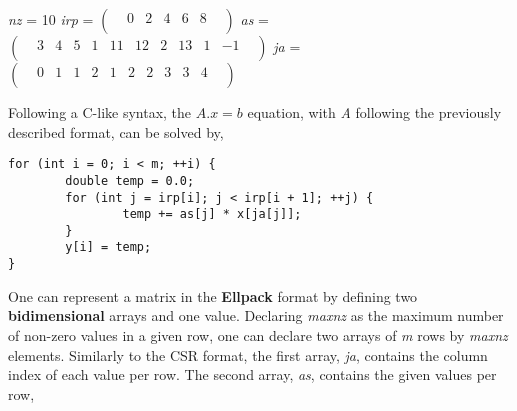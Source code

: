 \documentclass[12pt]{article}
\begin{document}
\begin{center}
\textit{nz}  =  10 
\linebreak
\linebreak
\textit{irp}  =   
$
\begin{pmatrix}
    & 0 & 2 & 4 & 6 & 8 & \\
\end{pmatrix}
$
\linebreak
\linebreak
\textit{as}  =   
$
\begin{pmatrix}
    & 3 & 4 & 5 & 1 & 11 & 12 & 2 & 13 & 1 & -1 & \\
\end{pmatrix}
$
\linebreak
\linebreak
\textit{ja}  =   
$
\begin{pmatrix}
    & 0 & 1 & 1 & 2 & 1 & 2 & 2 & 3 & 3 & 4 & \\
\end{pmatrix}
$
\linebreak
\end{center}

\par Following a C-like syntax, the $A . x = b$ equation, with \textit{A} following the previously described format, can be solved by,

\begin{lstlisting}
for (int i = 0; i < m; ++i) {
		double temp = 0.0;
		for (int j = irp[i]; j < irp[i + 1]; ++j) {
				temp += as[j] * x[ja[j]];
		}
		y[i] = temp;
}
\end{lstlisting}

\par One can represent a matrix in the \textbf{Ellpack} format by defining two \textbf{bidimensional} arrays and one value. Declaring \textit{maxnz} as the maximum number of non-zero values in a given row, one can declare two arrays of \textit{m} rows by \textit{maxnz} elements. Similarly to the CSR format, the first array, \textit{ja}, contains the column index of each value per row. The second array, \textit{as}, contains the given values per row,
\end{document}
